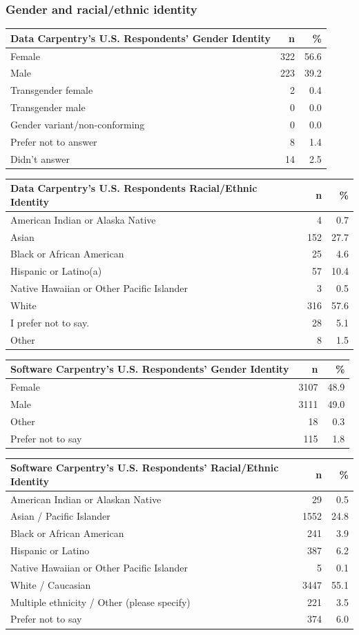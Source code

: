 \documentclass[]{article}
\begin{document}
\subsubsection{Gender and racial/ethnic
identity}\label{gender-and-racialethnic-identity}

\begin{longtable}[]{@{}lrr@{}}
\toprule
Data Carpentry's U.S. Respondents' Gender Identity & n &
\%\tabularnewline
\midrule
\endhead
Female & 322 & 56.6\tabularnewline
Male & 223 & 39.2\tabularnewline
Transgender female & 2 & 0.4\tabularnewline
Transgender male & 0 & 0.0\tabularnewline
Gender variant/non-conforming & 0 & 0.0\tabularnewline
Prefer not to answer & 8 & 1.4\tabularnewline
Didn't answer & 14 & 2.5\tabularnewline
\bottomrule
\end{longtable}

\begin{longtable}[]{@{}lrr@{}}
\toprule
Data Carpentry's U.S. Respondents Racial/Ethnic Identity & n &
\%\tabularnewline
\midrule
\endhead
American Indian or Alaska Native & 4 & 0.7\tabularnewline
Asian & 152 & 27.7\tabularnewline
Black or African American & 25 & 4.6\tabularnewline
Hispanic or Latino(a) & 57 & 10.4\tabularnewline
Native Hawaiian or Other Pacific Islander & 3 & 0.5\tabularnewline
White & 316 & 57.6\tabularnewline
I prefer not to say. & 28 & 5.1\tabularnewline
Other & 8 & 1.5\tabularnewline
\bottomrule
\end{longtable}

\begin{longtable}[]{@{}lrr@{}}
\toprule
Software Carpentry's U.S. Respondents' Gender Identity & n &
\%\tabularnewline
\midrule
\endhead
Female & 3107 & 48.9\tabularnewline
Male & 3111 & 49.0\tabularnewline
Other & 18 & 0.3\tabularnewline
Prefer not to say & 115 & 1.8\tabularnewline
\bottomrule
\end{longtable}

\begin{longtable}[]{@{}lrr@{}}
\toprule
Software Carpentry's U.S. Respondents' Racial/Ethnic Identity & n &
\%\tabularnewline
\midrule
\endhead
American Indian or Alaskan Native & 29 & 0.5\tabularnewline
Asian / Pacific Islander & 1552 & 24.8\tabularnewline
Black or African American & 241 & 3.9\tabularnewline
Hispanic or Latino & 387 & 6.2\tabularnewline
Native Hawaiian or Other Pacific Islander & 5 & 0.1\tabularnewline
White / Caucasian & 3447 & 55.1\tabularnewline
Multiple ethnicity / Other (please specify) & 221 & 3.5\tabularnewline
Prefer not to say & 374 & 6.0\tabularnewline
\bottomrule
\end{longtable}
\end{document}
